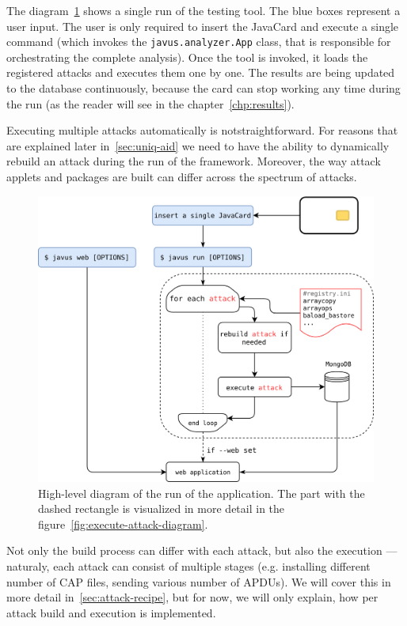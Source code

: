    The diagram~\ref{fig:full-design-diagram} shows a single run of the testing tool. The blue boxes represent a user input. The user is only required to insert the JavaCard and execute a single command \javusrun (which invokes the \texttt{javus.analyzer.App} class, that is responsible for orchestrating the complete analysis). Once the tool is invoked, it loads the registered attacks and executes them one by one. The results are being updated to the database continuously, because the card can stop working any time during the run (as the reader will see in the chapter~\ref{chp:results}).


    Executing multiple attacks automatically is not\linebreak straightforward. For reasons that are explained later in~\ref{sec:uniq-aid} we need to have the ability to dynamically rebuild an attack during the run of the framework. Moreover, the way attack applets and packages are built can differ across the spectrum of attacks.

    \begin{figure}[htb!]
        \centering
        \includegraphics[width=.9\textwidth]{src/diagrams/full-design-new.png}
        \caption{High-level diagram of the run of the application. The part with the dashed rectangle is visualized in more detail in the figure~\ref{fig:execute-attack-diagram}.}
        \label{fig:full-design-diagram}
    \end{figure}

        
    Not only the build process can differ with each attack, but also the execution --- naturaly, each attack can consist of multiple stages (e.g. installing different number of CAP files, sending various number of APDUs). We will cover this in more detail in~\ref{sec:attack-recipe}, but for now, we will only explain, how per attack build and execution is implemented.

